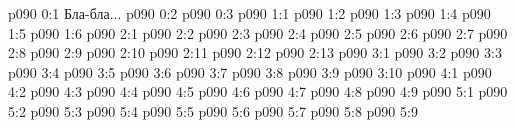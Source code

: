 \author{Мелхиседек}
\vs p090 0:1  Бла-бла...
\vs p090 0:2 
\vs p090 0:3 
\vs p090 1:1 
\vs p090 1:2 
\vs p090 1:3 
\vs p090 1:4 
\vs p090 1:5 
\vs p090 1:6 
\vs p090 2:1 
\vs p090 2:2 
\vs p090 2:3 
\vs p090 2:4 
\vs p090 2:5 
\vs p090 2:6 
\vs p090 2:7 
\vs p090 2:8 
\vs p090 2:9 
\vs p090 2:10 
\vs p090 2:11 
\vs p090 2:12 
\vs p090 2:13 
\vs p090 3:1 
\vs p090 3:2 
\vs p090 3:3 
\vs p090 3:4 
\vs p090 3:5 
\vs p090 3:6 
\vs p090 3:7 
\vs p090 3:8 
\vs p090 3:9 
\vs p090 3:10 \pc 
{}
\vs p090 4:1 
\vs p090 4:2 \pc 
\vs p090 4:3 \pc 
\vs p090 4:4 
\vs p090 4:5 
\vs p090 4:6 
\vs p090 4:7 
\vs p090 4:8 
\vs p090 4:9 
\vs p090 5:1 
\vs p090 5:2 
\vs p090 5:3 
\vs p090 5:4 \pc 
\vs p090 5:5 
\vs p090 5:6 
\vs p090 5:7 
\vs p090 5:8 
\vsetoff
\vs p090 5:9 
\quizlink
